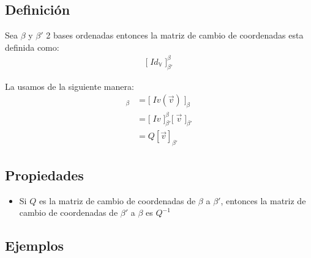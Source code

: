 \documentclass[12pt, fleqn]{report}                             %
\theoremstyle{break}                                            %
\DeclareMathOperator \VectorSet    {\mathbb{V}}                 %
\newcommand{\BigBrackets}[1]    {\Big[ \; #1 \; \Big]}          %
\begin{document}
            \subsection{Definición}

                Sea $\beta$ y $\beta'$ 2 bases ordenadas entonces la matriz de cambio de coordenadas
                esta definida como:
                \begin{align*}
                    \BigBrackets{Id_{\VectorSet}}_{\beta'}^{\beta}
                \end{align*}

                La usamos de la siguiente manera:
                \begin{align*}
                    [\vec v]_\beta 
                       &= \BigBrackets{Iv(\vec v)}_\beta                                    \\
                       &= \BigBrackets{Iv}_{\beta'}^\beta \BigBrackets{\vec v}_{\beta'}     \\
                       &= Q [\vec v]_{\beta'}
                \end{align*}



            \subsection{Propiedades}

                \begin{itemize}
                    \item 
                        Si $Q$ es la matriz de cambio de coordenadas de $\beta$ a $\beta'$,
                        entonces la matriz de cambio de coordenadas de $\beta'$ a $\beta$
                        es $Q^{-1}$
                \end{itemize}



            \clearpage
            \subsection{Ejemplos}
\end{document}
